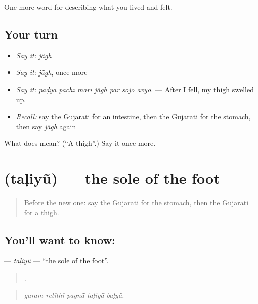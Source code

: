 \begin{grammarlens}[title={What you've built}]
One more word for describing what you lived and felt.
\end{grammarlens}

\subsection*{Your turn}
\begin{itemize}
\raggedright
  \item \emph{Say it:} \emph{jā̃gh}
  \item \emph{Say it:} \emph{jā̃gh}, once more
  \item \emph{Say it:} \emph{paḍyā pachī mārī jā̃gh par sojo āvyo.} — After I fell, my thigh swelled up.
  \item \emph{Recall:} say the Gujarati for an intestine, then the Gujarati for the stomach, then say \emph{jā̃gh} again
\end{itemize}

\begin{tcolorbox}[breakable,colback=teal!4,colframe=teal!35!black,title={Before you move on}]
What does  mean? (\textquotedblleft{}A thigh\textquotedblright{}.) Say it once more.
\end{tcolorbox}
\section[\texorpdfstring{\gu{તળિયું} (taḷiyũ)}{તળિયું (taḷiyũ)}]{ (taḷiyũ) — the sole of the foot}

\label{lesson:GU-C473-taliyu}



\begin{quote}
Before the new one: say the Gujarati for the stomach, then the Gujarati for a thigh.
\end{quote}

\subsection*{You'll want to know: }
\textbf{} — \emph{taḷiyũ} — \textquotedblleft{}the sole of the foot\textquotedblright{}.

\begin{quote}
    .
\end{quote}

\begin{quote}
\emph{garam retīthī pagnā̃ taḷiyā̃ baḷyā̃.}
\end{quote}

